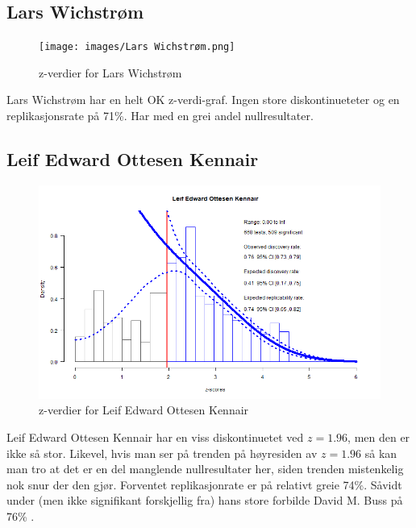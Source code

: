 \documentclass[doc,norsk]{apa7}
\begin{document}
\subsection{Lars Wichstrøm}
\begin{figure}[h!]
    \centering
    \texttt{[image: images/Lars Wichstrøm.png]}
    \caption{z-verdier for Lars Wichstrøm}
\end{figure}
Lars Wichstrøm har en helt OK z-verdi-graf. Ingen store diskontinueteter og en replikasjonsrate på 71\%. Har med en grei andel nullresultater.

\subsection{Leif Edward Ottesen Kennair}
\begin{figure}[h!]
    \centering
    \includegraphics[width=\textwidth]{images/Leif Edward Ottesen Kennair.png}
    \caption{z-verdier for Leif Edward Ottesen Kennair}
\end{figure}
Leif Edward Ottesen Kennair har en viss diskontinuetet ved $z=1.96$, men den er ikke så stor. Likevel, hvis man ser på trenden på høyresiden av $z=1.96$ så kan man tro at det er en del manglende nullresultater her, siden trenden mistenkelig nok snur der den gjør. Forventet replikasjonrate er på relativt greie 74\%. Såvidt under (men ikke signifikant forskjellig fra) hans store forbilde David M. Buss på 76\% \parencite{z-curve-david-buss}.
\end{document}
